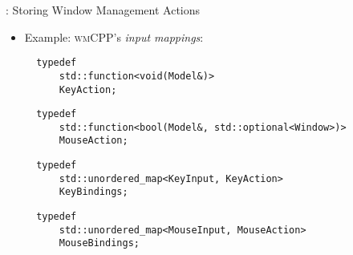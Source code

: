 \begin{frame}[fragile]{\underline{\cpp}: Storing Window Management Actions \hfill {\footnotesize \currentname}}


    \begin{itemize}

        \item Example: \textsc{wmCPP}'s \textit{input mappings}:\\[3pt]
\begin{verbatim}
  typedef
      std::function<void(Model&)>
      KeyAction;
\end{verbatim}
\begin{verbatim}
  typedef
      std::function<bool(Model&, std::optional<Window>)>
      MouseAction;
\end{verbatim}
\begin{verbatim}
  typedef
      std::unordered_map<KeyInput, KeyAction>
      KeyBindings;
\end{verbatim}
\begin{verbatim}
  typedef
      std::unordered_map<MouseInput, MouseAction>
      MouseBindings;
\end{verbatim}

    \end{itemize}

    \vfill

\end{frame}

